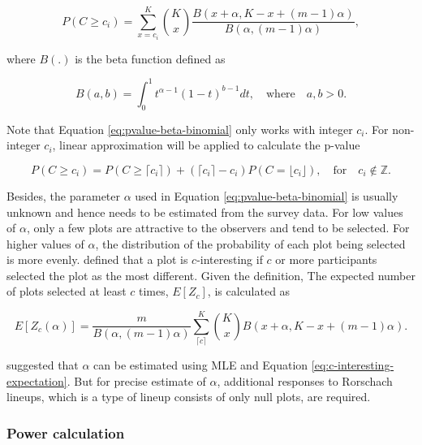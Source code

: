 \documentclass[]{interact}
\theoremstyle{plain}%
\theoremstyle{definition}
\theoremstyle{remark}
\begin{document}
\begin{equation} \label{eq:pvalue-beta-binomial}
P(C \geq c_i) = \sum_{x=c_i}^{K}{K \choose x}\frac{B(x + \alpha, K - x + (m - 1)\alpha)}{B(\alpha, (m-1)\alpha)},
\end{equation}

where \(B(.)\) is the beta function defined as

\begin{equation} \label{eq:betafunction}
B(a, b) = \int_{0}^{1}t^{\alpha - 1}(1-t)^{b-1}dt,\quad \text{where}\quad a,b>0. 
\end{equation}

Note that Equation \ref{eq:pvalue-beta-binomial} only works with integer
\(c_i\). For non-integer \(c_i\), linear approximation will be applied
to calculate the p-value

\begin{equation} \label{eq:pvalue-beta-binomial-approx}
P(C \geq c_i) = P(C \geq \lceil c_i \rceil) + (\lceil c_i \rceil - c_i) P(C = \lfloor c_i \rfloor), \quad \text{for}\quad c_i \notin \mathbb{Z}.
\end{equation}

Besides, the parameter \(\alpha\) used in Equation
\ref{eq:pvalue-beta-binomial} is usually unknown and hence needs to be
estimated from the survey data. For low values of \(\alpha\), only a few
plots are attractive to the observers and tend to be selected. For
higher values of \(\alpha\), the distribution of the probability of each
plot being selected is more evenly. \citet{vanderplas2021statistical}
defined that a plot is \(c\)-interesting if \(c\) or more participants
selected the plot as the most different. Given the definition, The
expected number of plots selected at least \(c\) times, \(E[Z_c]\), is
calculated as

\begin{equation} \label{eq:c-interesting-expectation}
E[Z_c(\alpha)] = \frac{m}{B(\alpha, (m-1)\alpha)}\sum_{\lceil c \rceil}^{K}{K \choose x} B(x + \alpha, K - x + (m-1)\alpha).\end{equation}

\citet{vanderplas2021statistical} suggested that \(\alpha\) can be
estimated using MLE and Equation \ref{eq:c-interesting-expectation}. But
for precise estimate of \(\alpha\), additional responses to Rorschach
lineups, which is a type of lineup consists of only null plots, are
required.

\hypertarget{power-calculation}{%
\subsubsection{Power calculation}\label{power-calculation}}
\end{document}
